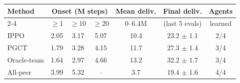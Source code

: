 \begin{tabular}{lcccccc}
\toprule
Method & \multicolumn{3}{c}{Onset (M steps)} & Mean deliv. & Final deliv. & Agents \\
\cmidrule(lr){2-4}
 & $\geq$1 & $\geq$10 & $\geq$20 & 0--6.4M & (last 5 evals) & learned \\
\midrule
IPPO & 2.05 & 3.17 & 5.07 & 10.4 & 23.2 $\pm$ 1.1 & 2/4 \\
PGCT & 1.79 & 3.28 & 4.15 & 11.7 & 27.3 $\pm$ 1.4 & 3/4 \\
Oracle-team & 1.64 & 2.97 & 4.66 & 13.2 & 32.2 $\pm$ 1.7 & 3/4 \\
All-peer & 3.99 & 5.32 & -- & 3.7 & 19.4 $\pm$ 1.6 & 4/4 \\
\bottomrule
\end{tabular}
